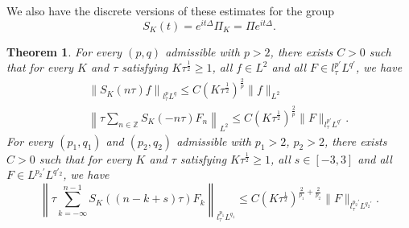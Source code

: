 \documentclass[10pt,a4paper]{article}
\newtheorem{theorem}{Theorem}[section]
\begin{document}
  We also have the discrete versions of these estimates for the group 
  \begin{equation}\label{SK}
    S_K(t) = e^{it\Delta} \Pi_K = \Pi e^{it\Delta}.
  \end{equation}

  \begin{theorem}\label{thmDSE} %
    For every \((p,q)\) admissible with \(p>2\), there exists \(C>0\) such that
    for every \(K\) and \(\tau\) satisfying \(K\tau^\frac12 \geq 1\), all \(
    f \in L^2 \) and all \(F \in l^{p'}_\tau L^{q'}\), we have 
    \begin{eqnarray}
      \label{T} & & \left\| S_{K}(n \tau) f\right\|_{l^p_\tau L^q} \leq C{(K\tau^\frac12)}^{\frac2p} \|f\|_{L^2} \\
      \label{T*} & & \left\| \tau\sum_{n \in \mathbb{Z}}  S_K (-n\tau) F_n \right\|_{L^2} \leq C {(K\tau^\frac12)}^\frac2p \|F\|_{l^{p'}_\tau L^{q'}}.
    \end{eqnarray}
    For every \((p_1, q_1)\) and \((p_2, q_2)\) admissible with \(p_1>2\),
    \(p_2>2\), there exists \(C > 0\) such that for every \(K\) and \(\tau\) 
    satisfying \(K\tau^\frac12 \geq 1\), all \( s \in [-3,3] \) and all 
    \(F \in L^{p_2'} L^{q'_2}\), we have
    \begin{equation}\label{TT*}
      \left\| \tau \sum_{k = -\infty}^{n-1}  S_K ((n-k+s)\tau) F_k \right\|_{l^{p_1}_\tau L^{q_1}}
      \leq C (K\tau^\frac12)^{ \frac2{p_1} + \frac2{p_2} }  \|F\|_{l^{p_2'}_\tau L^{q_2'}}.
    \end{equation}
  \end{theorem}

\end{document}
